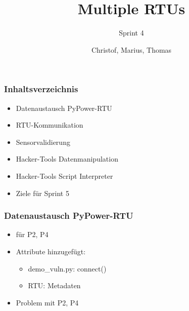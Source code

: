 \documentclass{beamer}
\author{Christof, Marius, Thomas}
\title{Multiple RTUs}
\subtitle{Sprint 4}
\begin{document}
%



\begin{frame}[plain]
	\maketitle
\end{frame}

\begin{frame}
	\frametitle{Inhaltsverzeichnis}
	\begin{itemize}
		\item Datenaustausch PyPower-RTU
		\item RTU-Kommunikation
		\item Sensorvalidierung
		\item Hacker-Tools Datenmanipulation
		\item Hacker-Tools Script Interpreter
		\item Ziele für Sprint 5
	\end{itemize}
\end{frame}

\begin{frame}
	\frametitle{Datenaustausch PyPower-RTU}
	\begin{itemize}
		\item für P2, P4
		\item Attribute hinzugefügt:
			\begin{itemize}
				\item demo\_vuln.py: connect()
				\item RTU: Metadaten
			\end{itemize}
		\pause
		\item Problem mit P2, P4
	\end{itemize}
\end{frame}
\end{document}
